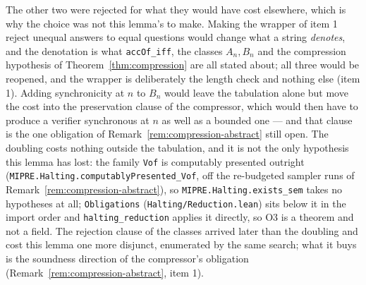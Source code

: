 The other two were rejected for what they would have cost elsewhere, which is why the choice
was not this lemma's to make. Making the wrapper of item 1 reject unequal answers to equal
questions would change what a string \emph{denotes}, and the denotation is what
\texttt{accOf\_iff}, the classes $A_n, B_n$ and the compression hypothesis of
Theorem~\ref{thm:compression} are all stated about; all three would be reopened, and the
wrapper is deliberately the length check and nothing else (item 1). Adding synchronicity at
$n$ to $B_n$ would leave the tabulation alone but move the cost into the preservation clause
of the compressor, which would then have to produce a verifier synchronous at $n$ as well as
a bounded one --- and that clause is the one obligation of
Remark~\ref{rem:compression-abstract} still open. The doubling costs nothing outside the
tabulation, and it is not the only hypothesis this lemma has lost: the family \texttt{Vof} is
computably presented outright (\texttt{MIPRE.Halting.computablyPresented\_Vof}, off the
re-budgeted sampler runs of Remark~\ref{rem:compression-abstract}), so
\texttt{MIPRE.Halting.exists\_sem} takes no hypotheses at all; \texttt{Obligations}
(\texttt{Halting/Reduction.lean}) sits below it in the import order and
\texttt{halting\_reduction} applies it directly, so O3 is a theorem and not a field. The
rejection clause of the classes arrived later than the doubling and cost this lemma one more
disjunct, enumerated by the same search; what it buys is the soundness direction of the
compressor's obligation (Remark~\ref{rem:compression-abstract}, item 1).

\effortMedium


